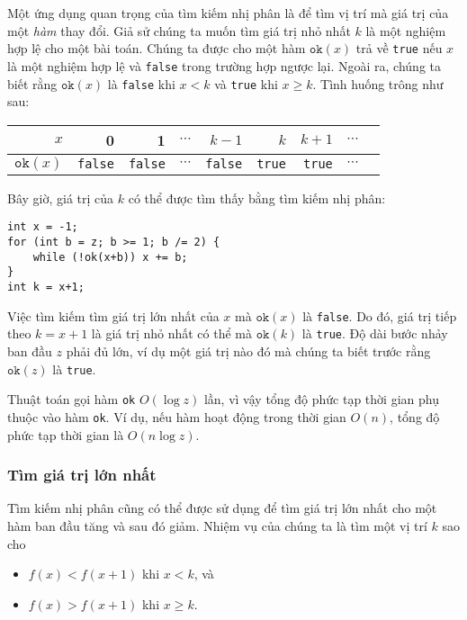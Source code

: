 Một ứng dụng quan trọng của tìm kiếm nhị phân là
để tìm vị trí mà giá trị của một \emph{hàm} thay đổi.
Giả sử chúng ta muốn tìm giá trị nhỏ nhất $k$
là một nghiệm hợp lệ cho một bài toán.
Chúng ta được cho một hàm $\texttt{ok}(x)$
trả về \texttt{true} nếu $x$ là một nghiệm hợp lệ
và \texttt{false} trong trường hợp ngược lại.
Ngoài ra, chúng ta biết rằng $\texttt{ok}(x)$ là \texttt{false}
khi $x<k$ và \texttt{true} khi $x \ge k$.
Tình huống trông như sau:

\begin{center}
\begin{tabular}{r|rrrrrrrr}
$x$ & 0 & 1 & $\cdots$ & $k-1$ & $k$ & $k+1$ & $\cdots$ \\
\hline
$\texttt{ok}(x)$ & \texttt{false} & \texttt{false}
& $\cdots$ & \texttt{false} & \texttt{true} & \texttt{true} & $\cdots$ \\
\end{tabular}
\end{center}

\noindent
Bây giờ, giá trị của $k$ có thể được tìm thấy bằng tìm kiếm nhị phân:

\begin{lstlisting}
int x = -1;
for (int b = z; b >= 1; b /= 2) {
    while (!ok(x+b)) x += b;
}
int k = x+1;
\end{lstlisting}

Việc tìm kiếm tìm giá trị lớn nhất của $x$ mà
$\texttt{ok}(x)$ là \texttt{false}.
Do đó, giá trị tiếp theo $k=x+1$
là giá trị nhỏ nhất có thể mà
$\texttt{ok}(k)$ là \texttt{true}.
Độ dài bước nhảy ban đầu $z$ phải
đủ lớn, ví dụ một giá trị nào đó
mà chúng ta biết trước rằng $\texttt{ok}(z)$ là \texttt{true}.

Thuật toán gọi hàm \texttt{ok}
$O(\log z)$ lần, vì vậy tổng độ phức tạp thời gian
phụ thuộc vào hàm \texttt{ok}.
Ví dụ, nếu hàm hoạt động trong thời gian $O(n)$,
tổng độ phức tạp thời gian là $O(n \log z)$.

\subsubsection{Tìm giá trị lớn nhất}

Tìm kiếm nhị phân cũng có thể được sử dụng để tìm
giá trị lớn nhất cho một hàm
ban đầu tăng và sau đó giảm.
Nhiệm vụ của chúng ta là tìm một vị trí $k$ sao cho

\begin{itemize}
\item
$f(x)<f(x+1)$ khi $x<k$, và
\item
$f(x)>f(x+1)$ khi $x \ge k$.
\end{itemize}

